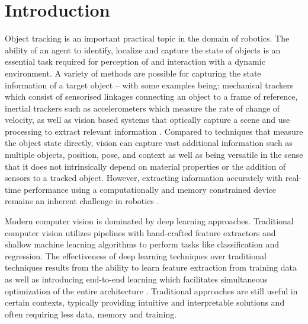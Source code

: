 \documentclass[a4paper,twoside,12pt]{report}
\begin{document}
\listoffigures
\newpage
{}
{}

\listoftables
\newpage
{}

\chapter{Introduction}

Object tracking is an important practical topic in the domain of robotics. The ability of an agent to identify, localize and capture the state of objects is an essential task required for perception of and interaction with a dynamic environment. A variety of methods are possible for capturing the state information of a target object -- with some examples being: mechanical trackers which consist of sensorised linkages connecting an object to a frame of reference, inertial trackers such as accelerometers which measure the rate of change of velocity, as well as vision based systems that optically capture a scene and use processing to extract relevant information \citep{track2}. Compared to techniques that measure the object state directly, vision can capture vast additional information such as multiple objects, position, pose,  and context as well as being versatile in the sense that it does not intrinsically depend on material properties or the addition of sensors to a tracked object. However, extracting information accurately with real-time performance using a computationally and memory constrained device remains an inherent challenge in robotics \citep{quantization, kalmannet}. 

Modern computer vision is dominated by deep learning approaches. Traditional computer vision utilizes pipelines with hand-crafted feature extractors and shallow machine learning algorithms to perform  tasks like classification and regression. The effectiveness of deep learning techniques over traditional techniques results from the ability to learn feature extraction from training data as well as introducing end-to-end learning which facilitates simultaneous optimization of the entire architecture \citep{tradvmod}. Traditional approaches are still useful in certain contexts, typically providing intuitive and interpretable solutions and often requiring less data, memory and training.
\end{document}
